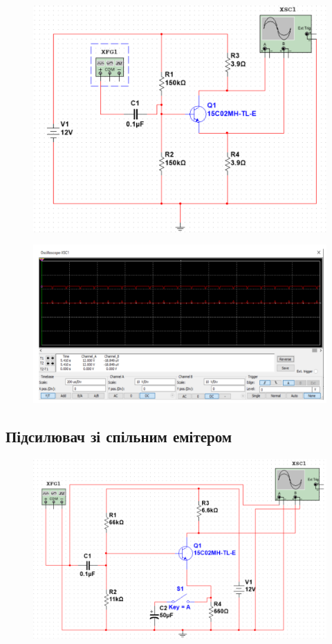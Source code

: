 \begin{figure}[ht]
\centering
\includegraphics[width=0.7\linewidth]{Pic/second_1.png}
\end{figure}


\begin{figure}[ht]
\centering
\includegraphics[width=0.9\linewidth]{Pic/second_2.png}
\end{figure}
\newpage

\subsection{ Підсилювач зі спільним емітером}
\setlength{\parindent}{4em}



\begin{figure}[ht]
\centering
\includegraphics[width=0.5\linewidth]{Pic/third_1.png}
\end{figure}



